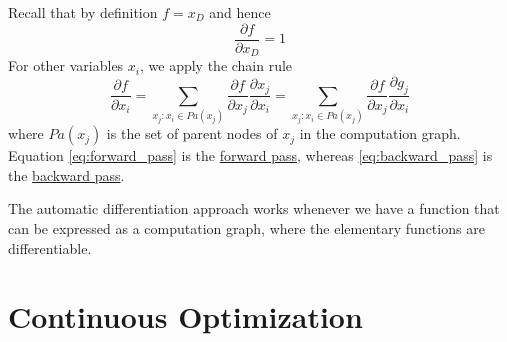\documentclass{article}
\begin{document}
Recall that by definition $f=x_D$ and hence
$$\frac{\partial{f}}{\partial{x_D}}=1$$
For other variables $x_i$, we apply the chain rule 
\begin{equation}\label{eq:backward_pass}
    \frac{\partial{f}}{\partial{x_i}}=\displaystyle\sum_{x_j:x_i\in
    Pa(x_j)}\frac{\partial{f}}{\partial{x_j}}\frac{\partial{x_j}}{\partial{x_i}}=\displaystyle\sum_{x_j:x_i\in
    Pa(x_j)}\frac{\partial{f}}{\partial{x_j}}\frac{\partial{g_j}}{\partial{x_i}}
\end{equation}
where $Pa(x_j)$ is the set of parent nodes of $x_j$ in the computation graph.
Equation \ref{eq:forward_pass} is the \underline{forward pass}, whereas
\ref{eq:backward_pass} is the \underline{backward pass}.

The automatic differentiation approach works whenever we have a function that
can be expressed as a computation graph, where the elementary functions are
differentiable. 
\cleardoublepage
\section{Continuous Optimization}
\end{document}
